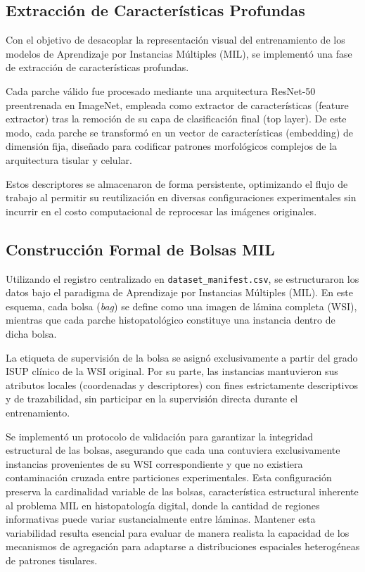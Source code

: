 \subsection{Extracción de Características Profundas}
\label{subsec:feature_extraction}
Con el objetivo de desacoplar la representación visual del entrenamiento de los modelos de Aprendizaje por Instancias Múltiples (MIL), se implementó una fase de extracción de características profundas.\newline

Cada parche válido fue procesado mediante una arquitectura ResNet-50 preentrenada en ImageNet, empleada como extractor de características (feature extractor) tras la remoción de su capa de clasificación final (top layer). De este modo, cada parche se transformó en un vector de características (embedding) de dimensión fija, diseñado para codificar patrones morfológicos complejos de la arquitectura tisular y celular. \newline

Estos descriptores se almacenaron de forma persistente, optimizando el flujo de trabajo al permitir su reutilización en diversas configuraciones experimentales sin incurrir en el costo computacional de reprocesar las imágenes originales.

\subsection{Construcción Formal de Bolsas MIL}
\label{subsec:bags_mil}
Utilizando el registro centralizado en \texttt{dataset\_manifest.csv}, se estructuraron los datos bajo el paradigma de Aprendizaje por Instancias Múltiples (MIL). En este esquema, cada bolsa (\textit{bag}) se define como una imagen de lámina completa (WSI), mientras que cada parche histopatológico constituye una instancia dentro de dicha bolsa.\newline

La etiqueta de supervisión de la bolsa se asignó exclusivamente a partir del grado ISUP clínico de la WSI original. Por su parte, las instancias mantuvieron sus atributos locales (coordenadas y descriptores) con fines estrictamente descriptivos y de trazabilidad, sin participar en la supervisión directa durante el entrenamiento.\newline

Se implementó un protocolo de validación para garantizar la integridad estructural de las bolsas, asegurando que cada una contuviera exclusivamente instancias provenientes de su WSI correspondiente y que no existiera contaminación cruzada entre particiones experimentales. Esta configuración preserva la cardinalidad variable de las bolsas, característica estructural inherente al problema MIL en histopatología digital, donde la cantidad de regiones informativas puede variar sustancialmente entre láminas. Mantener esta variabilidad resulta esencial para evaluar de manera realista la capacidad de los mecanismos de agregación para adaptarse a distribuciones espaciales heterogéneas de patrones tisulares.

